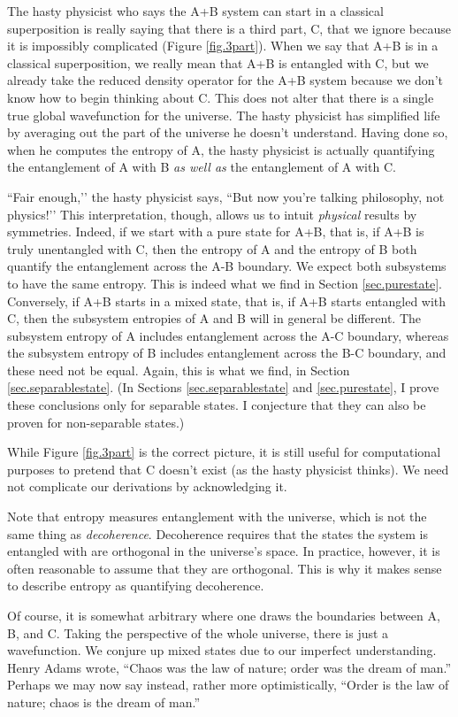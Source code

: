 The hasty physicist who says the A+B system can start in a classical superposition is really saying that there is a third part, C, that we ignore because it is impossibly complicated (Figure \ref{fig.3part}). When we say that A+B is in a classical superposition, we really mean that A+B is entangled with C, but we already take the reduced density operator for the A+B system because we don’t know how to begin thinking about C. This does not alter that there is a single true global wavefunction for the universe. The hasty physicist has simplified life by averaging out the part of the universe he doesn’t understand. Having done so, when he computes the entropy of A, the hasty physicist is actually quantifying the entanglement of A with B \emph{as well as} the entanglement of A with C.

``Fair enough,’’ the hasty physicist says, ``But now you’re talking philosophy, not physics!’’ This interpretation, though, allows us to intuit \emph{physical} results by symmetries. Indeed, if we start with a pure state for A+B, that is, if A+B is truly unentangled with C, then the entropy of A and the entropy of B both quantify the entanglement across the A-B boundary. We expect both subsystems to have the same entropy. This is indeed what we find in Section \ref{sec.purestate}. Conversely, if A+B starts in a mixed state, that is, if A+B starts entangled with C, then the subsystem entropies of A and B will in general be different. The subsystem entropy of A includes entanglement across the A-C boundary, whereas the subsystem entropy of B includes entanglement across the B-C boundary, and these need not be equal. Again, this is what we find, in Section \ref{sec.separablestate}. (In Sections \ref{sec.separablestate} and \ref{sec.purestate}, I prove these conclusions only for separable states. I conjecture that they can also be proven for non-separable states.)

While Figure \ref{fig.3part} is the correct picture, it is still useful for computational purposes to pretend that C doesn’t exist (as the hasty physicist thinks). We need not complicate our derivations by acknowledging it.

Note that entropy measures entanglement with the universe, which is not the same thing as \emph{decoherence}. Decoherence requires that the states the system is entangled with are orthogonal in the universe’s space. In practice, however, it is often reasonable to assume that they are orthogonal. This is why it makes sense to describe entropy as quantifying decoherence.

Of course, it is somewhat arbitrary where one draws the boundaries between A, B, and C. Taking the perspective of the whole universe, there is just a wavefunction. We conjure up mixed states due to our imperfect understanding. 
Henry Adams wrote, “Chaos was the law of nature; order was the dream of man.” Perhaps we may now say instead, rather more optimistically, “Order is the law of nature; chaos is the dream of man.”

